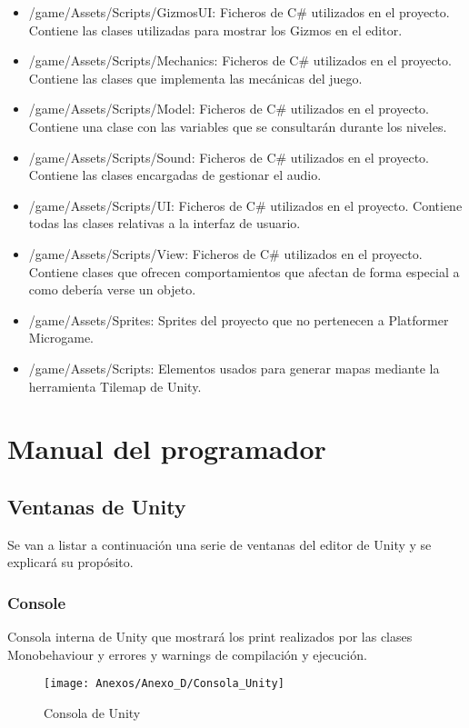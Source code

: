 \begin{itemize}
\item
/game/Assets/Scripts/GizmosUI: Ficheros de C\# utilizados en el proyecto. Contiene las clases utilizadas para mostrar los Gizmos en el editor.
\item
/game/Assets/Scripts/Mechanics: Ficheros de C\# utilizados en el proyecto. Contiene las clases que implementa las mecánicas del juego.
\item
/game/Assets/Scripts/Model: Ficheros de C\# utilizados en el proyecto. Contiene una clase con las variables que se consultarán durante los niveles.
\item
/game/Assets/Scripts/Sound: Ficheros de C\# utilizados en el proyecto. Contiene las clases encargadas de gestionar el audio.
\item
/game/Assets/Scripts/UI: Ficheros de C\# utilizados en el proyecto. Contiene todas las clases relativas a la interfaz de usuario.
\item
/game/Assets/Scripts/View: Ficheros de C\# utilizados en el proyecto. Contiene clases que ofrecen comportamientos que afectan de forma especial a como debería verse un objeto.
\item
/game/Assets/Sprites: Sprites del proyecto que no pertenecen a Platformer Microgame.
\item
/game/Assets/Scripts: Elementos usados para generar mapas mediante la herramienta Tilemap de Unity.
\end{itemize}

\section{Manual del programador}
\subsection{Ventanas de Unity}
Se van a listar a continuación una serie de ventanas del editor de Unity y se explicará su propósito.

\subsubsection{Console}
Consola interna de Unity que mostrará los print realizados por las clases Monobehaviour y errores y warnings de compilación y ejecución.

\clearpage
\begin{figure}[h]
\centering
\texttt{[image: Anexos/Anexo\_D/Consola\_Unity]}
\caption{Consola de Unity}
\end{figure}

